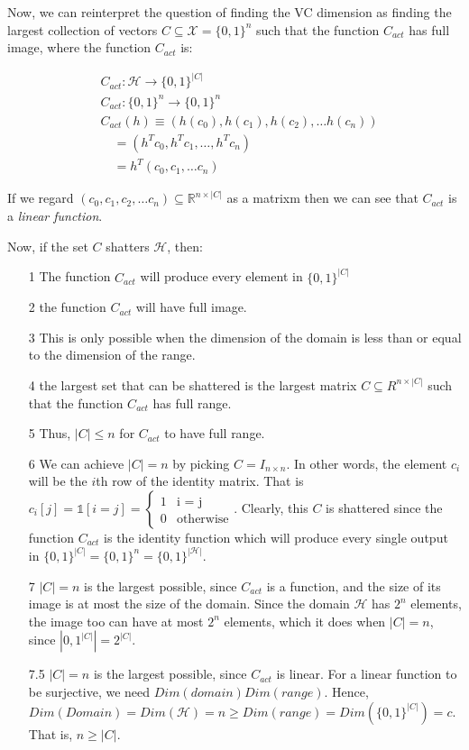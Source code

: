 \documentclass[11pt]{article}
\renewcommand{\H}{\ensuremath{\mathcal{H}}}
\newcommand{\X}{\ensuremath{\mathcal{X}}}
\begin{document}
Now, we can reinterpret the question of finding the VC dimension as finding
the largest collection of vectors $C \subseteq \X = \{0, 1\}^n$ such that
the function $C_{act}$ has full image, where the function $C_{act}$ is:

\begin{align*}
&C_{act}: \H \rightarrow \{0, 1\}^{|C|} \\
&C_{act}: \{0, 1\}^n \rightarrow \{0, 1\}^n \\
&C_{act}(h) \equiv (h(c_0), h(c_1), h(c_2), \dots h(c_n)) \\
&\quad = (h^T c_0, h^T c_1, \dots, h^T c_n) \\
& \quad = h^T (c_0, c_1, \dots c_n)
\end{align*}

If we regard $(c_0, c_1, c_2, \dots c_n) \subseteq \mathbb R^{n \times |C|}$
as a matrixm then we can see that  $C_{act}$ is a \emph{linear function}.


Now, if the set $C$ shatters $\H$, then:
\begin{itemize}
\item[1] The function $C_{act}$ will produce every element in $\{0, 1\}^{|C|}$
\item[2] the function $C_{act}$ will have full image. 
\item[3] This is  only possible when the dimension of the domain is less than or equal to the dimension of the range.
\item[4] the largest set that can be shattered is the largest matrix  $C \subseteq R^{n \times |C|}$  
         such that the function $C_{act}$ has full range.
\item[5] Thus, $|C| \leq n$ for $C_{act}$ to have full range.
\item[6] We can achieve $|C| = n$ by picking $C = I_{n \times n}$. In other words,
          the element $c_i$ will be the $i$th row of the identity matrix. That
          is $c_i[j] = \mathbb{1}[i = j] = \begin{cases} 1 & \text{i = j} \\ 0 & \text{otherwise} \end{cases}$.
         Clearly, this $C$ is shattered since the function $C_{act}$ is the identity function which
         will produce every single output in $\{0, 1\}^{|C|} = \{0, 1\}^n = \{0, 1\}^{|\H|}$.         
\item[7] $|C|=n$ is the largest possible, since $C_{act}$ is a function, and
         the size of its image is at most the size of the domain. Since the domain $\H$
         has $2^n$ elements, the image too can have at most $2^n$ elements, which
         it does when $|C| = n$, since $|{0, 1}^{|C|}| = 2^{|C|}$.
\item[7.5] $|C|=n$ is the largest possible, since $C_{act}$ is linear.
            For a linear function to be surjective, we need $Dim(domain)  Dim(range)$.
            Hence, $Dim(Domain) = Dim(\H) = n \geq Dim(range) = Dim(\{0, 1\}^{|C|}) = c$.
            That is, $n \geq |C|$.
\end{itemize}
\end{document}
